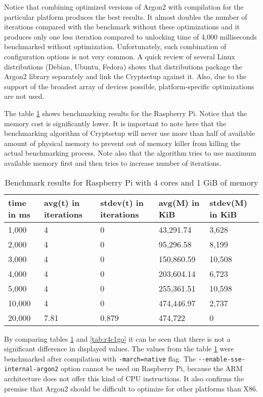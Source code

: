 \documentclass[nolof,digital]{fithesis3}
\begin{document}
Notice that combining optimized versions of Argon2 with compilation for the particular platform produces the best results. It almost doubles the number of iterations compared with the benchmark without these optimizations and it produces only one less iteration compared to unlocking time of 4,000 milliseconds benchmarked without optimization. Unfortunately, such combination of configuration options is not very common. A quick review of several Linux distributions (Debian, Ubuntu, Fedora) shows that distributions package the Argon2 library separately and link the Cryptsetup against it. Also, due to the support of the broadest array of devices possible, platform-specific optimizations are not used.

The table \ref{tab:r4c1g} shows benchmarking results for the Raspberry Pi.  Notice that the memory cost is significantly lower. It is important to note here that the benchmarking algorithm of Cryptsetup will never use more than half of available amount of physical memory to prevent out of memory killer from killing the actual benchmarking process. Note also that the algorithm tries to use maximum available memory first and then tries to increase number of iterations.

\noindent
\begin{table}
\caption{Benchmark results for Raspberry Pi with 4 cores and 1 GiB of memory}
\label{tab:r4c1g}
\begin{tabularx}{\textwidth}{| X | X | X | X | X |}
\hline
time in ms & avg(t)  in iterations & stdev(t) in iterations & avg(M) in KiB & stdev(M) in KiB\\
\hline
1,000 & 4 & 0 & 43,291.74 & 3,628\\
\hline
2,000 & 4 & 0 & 95,296.58 & 8,199\\
\hline
3,000 & 4 & 0 & 150,860.59 & 10,508\\
\hline
4,000 & 4 & 0 & 203,604.14 & 6,723\\
\hline
5,000 & 4 & 0 & 255,361.51 & 10,598\\
\hline
10,000 & 4 & 0 & 474,446.97 & 2,737\\
\hline
20,000 & 7.81 & 0.879 & 474,722 & 0\\
\hline
\end{tabularx}
\end{table}

By comparing tables \ref{tab:r4c1g} and \ref{tab:r4c1go} it can be seen that there is not a significant difference in displayed values. The values from the table \ref{tab:r4c1g} were benchmarked after compilation with \verb+-march=native+ flag. The \verb+--enable-sse-internal-argon2+ option cannot be used on Raspberry Pi, because the ARM architecture does not offer this kind of CPU instructions. It also confirms the premise that Argon2 should be difficult to optimize for other platforms than X86.
\end{document}
